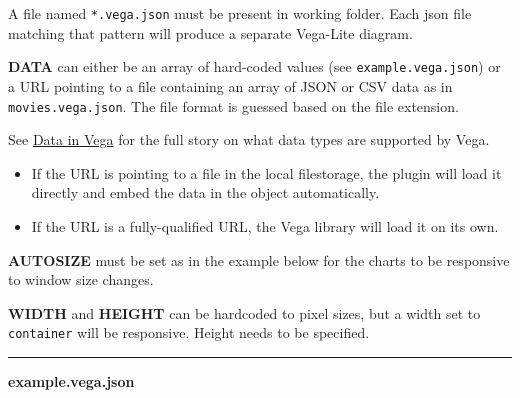 A file named \texttt{*.vega.json} must be present in working folder.
Each json file matching that pattern will produce a separate Vega-Lite
diagram.

\textbf{DATA} can either be an array of hard-coded values (see
\texttt{example.vega.json}) or a URL pointing to a file containing an
array of JSON or CSV data as in \texttt{movies.vega.json}. The file
format is guessed based on the file extension.

See \href{https://vega.github.io/vega-lite/docs/data.html}{Data in Vega}
for the full story on what data types are supported by Vega.

\begin{itemize}
\tightlist
\item
  If the URL is pointing to a file in the local filestorage, the plugin
  will load it directly and embed the data in the object automatically.
\item
  If the URL is a fully-qualified URL, the Vega library will load it on
  its own.
\end{itemize}

\textbf{AUTOSIZE} must be set as in the example below for the charts to
be responsive to window size changes.

\textbf{WIDTH} and \textbf{HEIGHT} can be hardcoded to pixel sizes, but
a width set to \texttt{container} will be responsive. Height needs to be
specified.

\begin{center}\rule{0.5\linewidth}{0.5pt}\end{center}

\textbf{example.vega.json}

